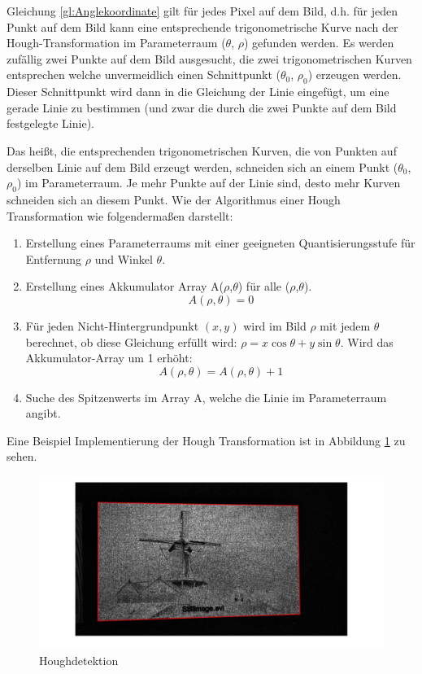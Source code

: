 Gleichung \ref{gl:Anglekoordinate} gilt für jedes Pixel auf dem Bild, d.h. für jeden Punkt auf dem Bild kann eine entsprechende trigonometrische Kurve nach der Hough-Transformation im Parameterraum ($ \theta $, $ \rho $) gefunden werden. Es werden zufällig zwei Punkte auf dem Bild ausgesucht, die zwei  trigonometrischen Kurven entsprechen welche unvermeidlich einen Schnittpunkt ($ \theta_0 $, $ \rho_0 $) erzeugen werden. Dieser Schnittpunkt wird dann in die Gleichung der Linie eingefügt, um eine gerade Linie zu bestimmen (und zwar die durch die zwei Punkte auf dem Bild festgelegte Linie). 

Das heißt, die entsprechenden trigonometrischen Kurven, die von Punkten auf derselben Linie auf dem Bild erzeugt werden, schneiden sich an einem Punkt ($ \theta_0 $, $ \rho_0 $) im Parameterraum. Je mehr Punkte auf der Linie sind, desto mehr Kurven schneiden sich an diesem Punkt. Wie der Algorithmus einer Hough Transformation wie folgendermaßen darstellt:

\begin{enumerate}
\item Erstellung eines Parameterraums mit einer geeigneten Quantisierungsstufe für Entfernung $ \rho $ und Winkel $ \theta $.
\item Erstellung eines Akkumulator Array A($ \rho $,$ \theta $) für alle ($ \rho $,$ \theta $).
\begin{equation}
A(\rho,\theta) = 0
\end{equation}
\item Für jeden Nicht-Hintergrundpunkt $ (x,y) $ wird im Bild $ \rho $ mit jedem $ \theta $ berechnet, ob diese Gleichung erfüllt wird: $ \rho = x \cos \theta + y \sin \theta $. Wird das Akkumulator-Array um 1 erhöht: 
\begin{equation}
 A(\rho,\theta) = A(\rho,\theta) + 1 
\end{equation}
\item Suche des Spitzenwerts im Array A, welche die Linie im Parameterraum angibt.
\end{enumerate}

Eine Beispiel Implementierung der Hough Transformation ist in Abbildung \ref{fig:Houghdetektion} zu sehen.

\begin{figure}[H]
 \centering 
  \includegraphics[keepaspectratio,width=1.0\textwidth]{images/4_ZweiteErfahrung/Hough/Houghdetektion.pdf}
 \caption{Houghdetektion}
 \label{fig:Houghdetektion}
\end{figure}




